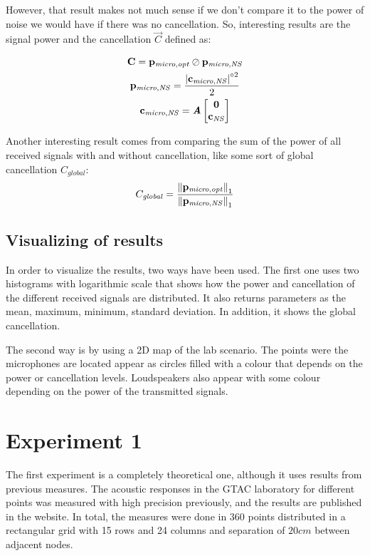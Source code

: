 However, that result makes not much sense if we don't compare it to the power of noise we would have if there was no cancellation. So, interesting results are the signal power and the cancellation $\vec{C}$ defined as:

\begin{gather}
\mathbf{C} = \mathbf{p_\mathit{micro,opt}} \oslash \mathbf{p_\mathit{micro,NS}} \\
\mathbf{p_\mathit{micro,NS}} = \frac{\left| \mathbf{c_{\mathit{micro,NS}}} \right|^{\circ 2}}{2}\\
\mathbf{c_{\mathit{micro,NS}}} = \bm{\mathit{A}} 
\begin{bmatrix}
	\mathbf{0} \\
	\mathbf{c_{\mathit{NS}}}
\end{bmatrix}
\end{gather}

Another interesting result comes from comparing the sum of the power of all received signals with and without cancellation, like some sort of global cancellation $C_\mathit{global}$:
\begin{equation}
C_\mathit{global} = \frac{\left\| \mathbf{p_\mathit{micro,opt}} \right\|_1}{\left\| \mathbf{p_\mathit{micro,NS}} \right\|_1}
\end{equation}

\subsection{Visualizing of results}
In order to visualize the results, two ways have been used. The first one uses two histograms with logarithmic scale that shows how the power and cancellation of the different received signals are distributed. It also returns parameters as the mean, maximum, minimum, standard deviation. In addition, it shows the global cancellation.

The second way is by using a 2D map of the lab scenario. The points were the microphones are located appear as circles filled with a colour that depends on the power or cancellation levels. Loudspeakers also appear with some colour depending on the power of the transmitted signals.

\section{Experiment 1}
The first experiment is a completely theoretical one, although it uses results from previous measures. The acoustic responses in the GTAC laboratory for different points was measured with high precision previously, and the results are published in the website. In total, the measures were done in 360 points distributed in a rectangular grid with 15 rows and 24 columns and separation of $20 \si{cm}$ between adjacent nodes.

